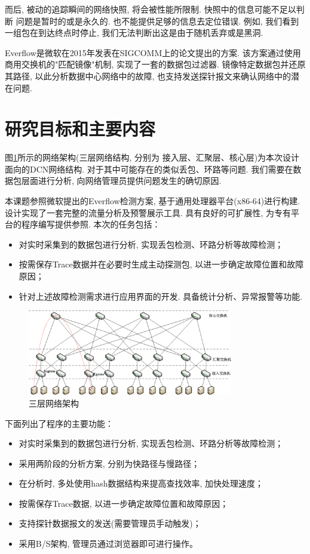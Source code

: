 而后, 被动的追踪瞬间的网络快照, 将会被性能所限制. 快照中的信息可能不足以判断
问题是暂时的或是永久的. 也不能提供足够的信息去定位错误.
例如, 我们看到一组包在到达终点时停止,
我们无法判断出这是由于随机丢弃或是黑洞.

Everflow是微软在2015年发表在SIGCOMM上的论文提出的方案. 该方案通过使用
商用交换机的"匹配镜像"机制, 实现了一套的数据包过滤器.
镜像特定数据包并还原其路径, 以此分析数据中心网络中的故障,
也支持发送探针报文来确认网络中的潜在问题.

\section{研究目标和主要内容}

  图\ref{fig:3level}所示的网络架构(三层网络结构, 分别为
接入层、汇聚层、核心层)为本次设计面向的DCN网络结构.
对于其中可能存在的类似丢包、环路等问题. 我们需要在数据包层面进行分析,
向网络管理员提供问题发生的确切原因.

  本课题参照微软提出的Everflow检测方案, 基于通用处理器平台(x86-64)进行构建.
设计实现了一套完整的流量分析及预警展示工具.
具有良好的可扩展性, 为专有平台的程序编写提供参照. 本次的任务包括：

\begin{itemize}
  \item 对实时采集到的数据包进行分析, 实现丢包检测、环路分析等故障检测；
  \item 按需保存Trace数据并在必要时生成主动探测包, 以进一步确定故障位置和故障原因；
  \item 针对上述故障检测需求进行应用界面的开发. 具备统计分析、异常报警等功能.
\end{itemize}

\begin{figure}[htbp!]
  \centering
  \includegraphics[width=0.8\textwidth]{../img/3level.png}
  \caption{三层网络架构}
  \label{fig:3level}
\end{figure}


下面列出了程序的主要功能：
\begin{itemize}
  \item
    对实时采集到的数据包进行分析, 实现丢包检测、环路分析等故障检测；
  \item
    采用两阶段的分析方案, 分别为快路径与慢路径；
  \item
    在分析时, 多处使用hash数据结构来提高查找效率, 加快处理速度；
  \item
    按需保存Trace数据, 以进一步确定故障位置和故障原因；
  \item
    支持探针数据报文的发送(需要管理员手动触发)；
  \item
    采用B/S架构, 管理员通过浏览器即可进行操作。
\end{itemize}

